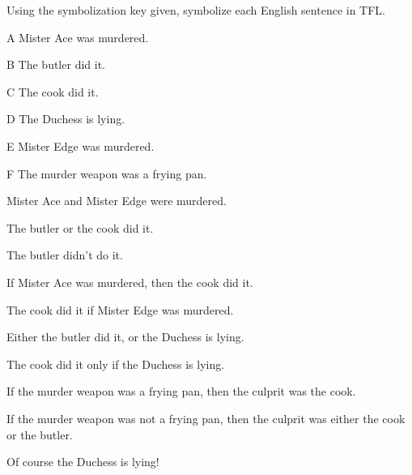\begin{practiceproblems}
\problempart Using the symbolization key given, symbolize each English sentence in TFL.
\begin{ekey}
\item[A] Mister Ace was murdered.
\item[B] The butler did it.
\item[C] The cook did it.
\item[D] The Duchess is lying.
\item[E] Mister Edge was murdered.
\item[F] The murder weapon was a frying pan.
\end{ekey}
\begin{earg}
\item Mister Ace and Mister Edge were murdered.
\item The butler or the cook did it.
\item The butler didn't do it.
\item If Mister Ace was murdered, then the cook did it.
\item The cook did it if Mister Edge was murdered.
\item Either the butler did it, or the Duchess is lying.
\item The cook did it only if the Duchess is lying.
\item If the murder weapon was a frying pan, then the culprit was the cook.
\item If the murder weapon was not a frying pan, then the culprit was either the cook or the butler.
\item Of course the Duchess is lying!
\end{earg}
\solutions


\end{practiceproblems}
